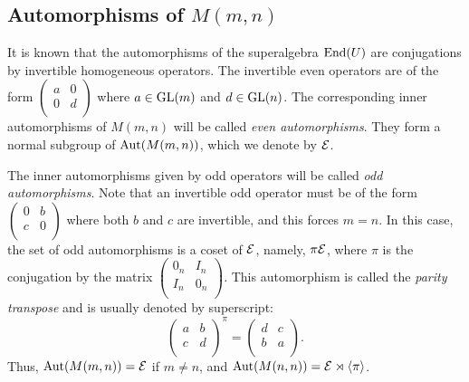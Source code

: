 \subsection{Automorphisms of $M(m,n)$}

It is known that the automorphisms of the superalgebra $\operatorname{End}(U)$ are conjugations by invertible homogeneous operators. 
The invertible even operators are of the form $\left( \begin{matrix}
a&0\\
0&d\\
\end{matrix}\right)$ where $a\in \operatorname{GL}(m)$ and $d\in \operatorname{GL}(n)$. The corresponding inner automorphisms of $M(m,n)$ will be called \emph{even automorphisms}. 
They form a normal subgroup of $\operatorname{Aut}(M(m,n))$, which we denote by $\mathcal E$.

The inner automorphisms given by odd operators will be called \emph{odd automorphisms}. 
Note that an invertible odd operator must be of the form $\left( \begin{matrix}
0&b\\
c&0\\
\end{matrix}\right)$ where both $b$ and $c$ are invertible, and this forces $m=n$. 
In this case, the set of odd automorphisms is a coset of $\mathcal E$, namely, $\pi \mathcal E$, 
where $\pi$ is the conjugation by the matrix $\left( \begin{matrix}
0_n & I_n\\
I_n & 0_n\\
\end{matrix}\right)$. This automorphism is called the \emph{parity transpose} and is usually denoted by superscript: 
\begin{equation*} %
\left( \begin{matrix}
a&b\\
c&d\\
\end{matrix}\right)^\pi = \left( \begin{matrix}
d&c\\
b&a\\
\end{matrix}\right).
\end{equation*} 
Thus, $\operatorname{Aut} (M(m,n)) = \mathcal E$ if $m\neq n$, and $\operatorname{Aut} (M(n,n)) = \mathcal E \rtimes \langle \pi \rangle$.

